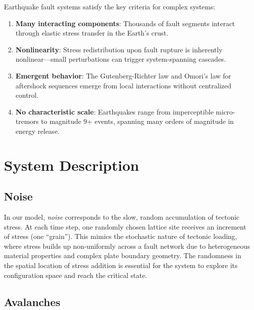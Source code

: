 \documentclass[12pt,a4paper]{article}
\begin{document}
Earthquake fault systems satisfy the key criteria for complex systems:
\begin{enumerate}
    \item \textbf{Many interacting components}: Thousands of fault segments
          interact through elastic stress transfer in the Earth's crust.
    \item \textbf{Nonlinearity}: Stress redistribution upon fault rupture is
          inherently nonlinear---small perturbations can trigger
          system-spanning cascades.
    \item \textbf{Emergent behavior}: The Gutenberg-Richter law and
          Omori's law for aftershock sequences emerge from local
          interactions without centralized control.
    \item \textbf{No characteristic scale}: Earthquakes range from
          imperceptible micro-tremors to magnitude 9+ events, spanning
          many orders of magnitude in energy release.
\end{enumerate}

\section{System Description}

\subsection{Noise}

In our model, \textit{noise} corresponds to the slow, random accumulation
of tectonic stress. At each time step, one randomly chosen lattice site
receives an increment of stress (one ``grain''). This mimics the stochastic
nature of tectonic loading, where stress builds up non-uniformly across
a fault network due to heterogeneous material properties and complex
plate boundary geometry. The randomness in the spatial location of stress
addition is essential for the system to explore its configuration space
and reach the critical state.

\subsection{Avalanches}
\end{document}

